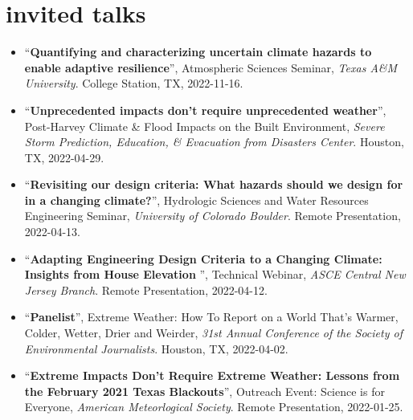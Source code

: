 \documentclass[10pt,oneside]{article}
\begin{document}
\mbox{}\vspace{-\dimexpr\baselineskip\relax}
\vspace*{-1em}
\printbibliography[filter=ispreprint, heading=none]


\section{invited talks}

\mbox{}\vspace{-\dimexpr\baselineskip\relax}

\begin{itemize}[label={}]
  
  \item \enquote{\textbf{Quantifying and characterizing uncertain climate hazards to enable adaptive resilience}}, Atmospheric Sciences Seminar,  \textit{Texas A\&M University}. College Station, TX, 2022-11-16.
  
  \item \enquote{\textbf{Unprecedented impacts don't require unprecedented weather}}, Post-Harvey Climate \& Flood Impacts on the Built Environment,  \textit{Severe Storm Prediction, Education, \& Evacuation from Disasters Center}. Houston, TX, 2022-04-29.
  
  \item \enquote{\textbf{Revisiting our design criteria: What hazards should we design for in a changing climate?}}, Hydrologic Sciences and Water Resources Engineering Seminar,  \textit{University of Colorado Boulder}. Remote Presentation, 2022-04-13.
  
  \item \enquote{\textbf{Adapting Engineering Design Criteria to a Changing Climate: Insights from House Elevation }}, Technical Webinar,  \textit{ASCE Central New Jersey Branch}. Remote Presentation, 2022-04-12.
  
  \item \enquote{\textbf{Panelist}}, Extreme Weather: How To Report on a World That's Warmer, Colder, Wetter, Drier and Weirder,  \textit{31st Annual Conference of the Society of Environmental Journalists}. Houston, TX, 2022-04-02.
  
  \item \enquote{\textbf{Extreme Impacts Don't Require Extreme Weather: Lessons from the February 2021 Texas Blackouts}}, Outreach Event: Science is for Everyone,  \textit{American Meteorlogical Society}. Remote Presentation, 2022-01-25.
  

\end{itemize}
\end{document}
